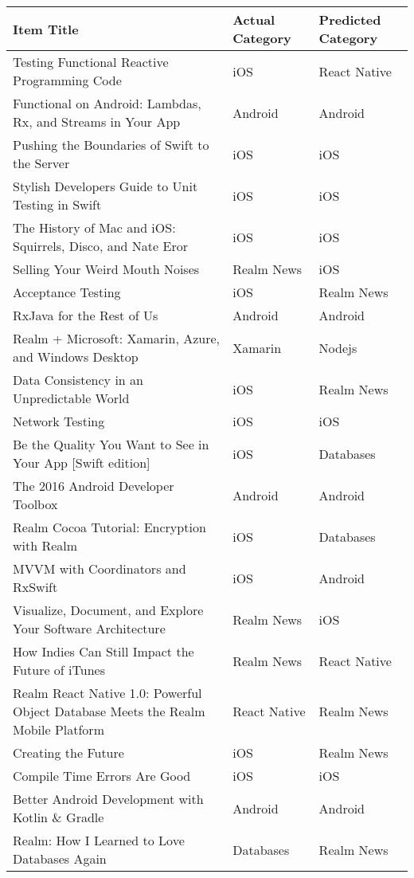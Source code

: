 \documentclass[letterpaper,11pt]{article}
\begin{document}
\begin{table}[h]
\centering
\begin{adjustbox}{max width=\linewidth}
\begin{tabular}{ | l | l | l |}
\hline
\textbf{Item Title} & \textbf{Actual Category} & \textbf{Predicted Category} \\
\hline
Testing Functional Reactive Programming Code & iOS & React Native \\
Functional on Android: Lambdas, Rx, and Streams in Your App & Android & Android \\
Pushing the Boundaries of Swift to the Server & iOS & iOS \\
Stylish Developers Guide to Unit Testing in Swift & iOS & iOS \\
The History of Mac and iOS: Squirrels, Disco, and Nate Eror & iOS & iOS \\
Selling Your Weird Mouth Noises & Realm News & iOS \\
Acceptance Testing & iOS & Realm News \\
RxJava for the Rest of Us & Android & Android \\
Realm + Microsoft: Xamarin, Azure, and Windows Desktop & Xamarin & Nodejs \\
Data Consistency in an Unpredictable World & iOS & Realm News \\
Network Testing & iOS & iOS \\
Be the Quality You Want to See in Your App [Swift edition] & iOS & Databases \\
The 2016 Android Developer Toolbox & Android & Android \\
Realm Cocoa Tutorial: Encryption with Realm & iOS & Databases \\
MVVM with Coordinators and RxSwift & iOS & Android \\
Visualize, Document, and Explore Your Software Architecture & Realm News & iOS \\
How Indies Can Still Impact the Future of iTunes & Realm News & React Native \\
Realm React Native 1.0: Powerful Object Database Meets the Realm Mobile Platform & React Native & Realm News \\
Creating the Future & iOS & Realm News \\
Compile Time Errors Are Good & iOS & iOS \\
Better Android Development with Kotlin \& Gradle & Android & Android \\
Realm: How I Learned to Love Databases Again & Databases & Realm News \\

\end{tabular}
\end{adjustbox}
\end{table}
\end{document}
